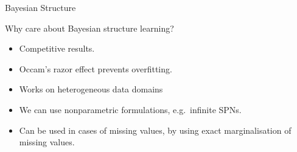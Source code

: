 %

\begin{frame}{Bayesian Structure}
    \begin{block}{Why care about Bayesian structure learning?}

\begin{itemize}
        \item Competitive results.
        \item Occam's razor effect prevents overfitting.
        \item Works on heterogeneous data domains
        \item We can use nonparametric formulations, e.g.~infinite SPNs.
        \item Can be used in cases of missing values, by using exact marginalisation of missing values.
    \end{itemize}
\end{block}
\end{frame}

